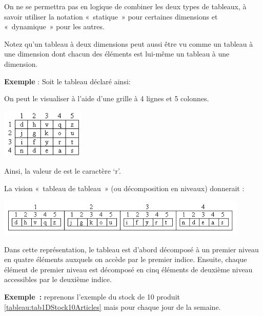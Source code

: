 	
	
	On ne se permettra pas en logique de
	combiner les deux types de tableaux, à savoir utiliser la notation
	«~statique~» pour certaines dimensions et «~dynamique~» pour les
	autres.

	Notez qu'un tableau à deux dimensions peut aussi être
	vu comme un tableau à une dimension dont chacun des éléments est
	lui-même un tableau à une dimension.

	\textbf{Exemple} : Soit le tableau déclaré ainsi:


	On peut le visualiser à l’aide d’une grille à 4 lignes et 5 colonnes.

	\begin{center}
	\includegraphics[width=4cm]{image/tab2d-vision-tab2d}
	\end{center}

	Ainsi, la valeur de  
	est le caractère ‘r’. 
	
	La vision «~tableau de tableau~» 
	(ou décomposition en niveaux)
	donnerait :

	\begin{center}
	\includegraphics[width=0.9\textwidth]{image/tab2d-vision-tabtab}
	\end{center}

	Dans cette représentation, le tableau  est
	d’abord décomposé à un premier niveau en quatre éléments auxquels on
	accède par le premier indice. Ensuite, chaque élément de premier niveau
	est décomposé en cinq éléments de deuxième niveau accessibles par le
	deuxième indice.
	
	\textbf{Exemple~:} reprenons l'exemple du stock de 10 produit
	\vref{tableau:tab1DStock10Articles} mais pour chaque jour de la semaine.
	
